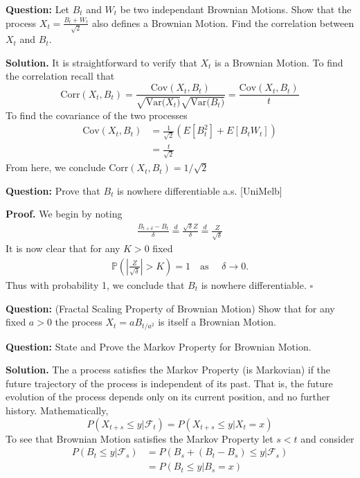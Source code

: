 \documentclass{article}
\begin{document}
\begin{tcolorbox}[colframe=black,colback=gray!5,boxrule=0.5pt]
\textbf{Question:} Let $B_t$ and $W_t$ be two independant Brownian Motions. Show that the process $X_t = \frac{B_t + W_t}{\sqrt{2}}$ also defines a Brownian Motion. Find the correlation between $X_t$ and $B_t$. 
\end{tcolorbox}
\textbf{Solution.} It is straightforward to verify that $X_t$ is a Brownian Motion. To find the correlation recall that 
$$\text{Corr}(X_t, B_t) = \frac{\text{Cov}(X_t, B_t)}{\sqrt{\text{Var($X_t$)}}\sqrt{\text{Var($B_t$)}}} = \frac{\text{Cov}(X_t, B_t)}{t}$$
To find the covariance of the two processes
\begin{align*}
    \text{Cov}(X_t ,B_t) &= \frac{1}{\sqrt{2}}(E[B_t^2] + E[B_tW_t]) \\
    &= \frac{t}{\sqrt{2}}
\end{align*}
From here, we conclude Corr$(X_t, B_t) = 1/\sqrt{2}$

\begin{tcolorbox}[colframe=black,colback=gray!5,boxrule=0.5pt]
\textbf{Question:} Prove that $B_t$ is nowhere differentiable a.s. [UniMelb]  
\end{tcolorbox}
\textbf{Proof.} We begin by noting 
\begin{align*}
    \frac{B_{t+\delta} - B_t}{\delta} \stackrel{d}{=} \frac{\sqrt{\delta} Z}{\delta} \stackrel{d}{=} \frac{Z}{\sqrt{\delta}}
\end{align*}
It is now clear that for any $K > 0$ fixed
\begin{align*}
    \mathbb{P}\left(\left|\frac{Z}{\sqrt{\delta}}\right| > K \right) =1 \quad \text{as } \quad \delta\to0. 
\end{align*}
Thus with probability 1, we conclude that $B_t$ is nowhere differentiable. $\square$

\begin{tcolorbox}[colframe=black,colback=gray!5,boxrule=0.5pt]
\textbf{Question:} (Fractal Scaling Property of Brownian Motion) Show that for any fixed $a>0$  the process $X_t = aB_{t/a^2}$ is itself a Brownian Motion.  
\end{tcolorbox}


\begin{tcolorbox}[colframe=black,colback=gray!5,boxrule=0.5pt]
\textbf{Question:} State and Prove the Markov Property for Brownian Motion.
\end{tcolorbox}
\textbf{Solution.} The a process satisfies the Markov Property (is Markovian) if the future trajectory of the process is independent of its past. That is, the future evolution of the process depends only on its current position, and no further history. Mathematically, 
$$P(X_{t+s} \leq y| \mathcal{F}_t) = P(X_{t+s} \leq y| X_t=x)$$
To see that Brownian Motion satisfies the Markov Property let $s <t$ and consider 
\begin{align*}
    P(B_t \leq y| \mathcal{F}_s) &= P(B_s + (B_t-B_s) \leq y|\mathcal{F}_s) \\
    &= P(B_t \leq y| B_s =x) \\
\end{align*}
\end{document}
